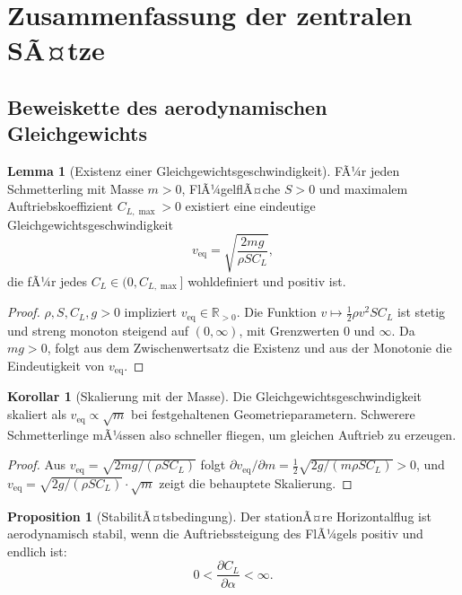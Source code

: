 ﻿\documentclass[a4paper,12pt]{article}
\theoremstyle{definition}
\newtheorem{lemma}{Lemma}
\newtheorem{korollar}{Korollar}
\newtheorem{proposition}{Proposition}
\begin{document}
	\section{Zusammenfassung der zentralen SÃ¤tze}
	
	\subsection{Beweiskette des aerodynamischen Gleichgewichts}
	
	\begin{lemma}[Existenz einer Gleichgewichtsgeschwindigkeit]
		\label{lem:gleichgewicht}
		FÃ¼r jeden Schmetterling mit Masse $m > 0$, FlÃ¼gelflÃ¤che $S > 0$ und
		maximalem Auftriebskoeffizient $C_{L,\max} > 0$ existiert eine eindeutige
		Gleichgewichtsgeschwindigkeit
		\[
		v_\mathrm{eq} = \sqrt{\frac{2mg}{\rho S C_L}},
		\]
		die fÃ¼r jedes $C_L \in (0, C_{L,\max}]$ wohldefiniert und positiv ist.
	\end{lemma}
	
	\begin{proof}
		$\rho, S, C_L, g > 0$ impliziert $v_\mathrm{eq} \in \mathbb{R}_{>0}$.
		Die Funktion $v \mapsto \frac{1}{2}\rho v^2 S C_L$ ist stetig und streng monoton
		steigend auf $(0,\infty)$, mit Grenzwerten $0$ und $\infty$.
		Da $mg > 0$, folgt aus dem Zwischenwertsatz die Existenz und aus der Monotonie
		die Eindeutigkeit von $v_\mathrm{eq}$.
	\end{proof}
	
	\begin{korollar}[Skalierung mit der Masse]
		Die Gleichgewichtsgeschwindigkeit skaliert als $v_\mathrm{eq} \propto \sqrt{m}$
		bei festgehaltenen Geometrieparametern.
		Schwerere Schmetterlinge mÃ¼ssen also schneller fliegen, um gleichen Auftrieb
		zu erzeugen.
	\end{korollar}
	
	\begin{proof}
		Aus $v_\mathrm{eq} = \sqrt{2mg/(\rho S C_L)}$ folgt
		$\partial v_\mathrm{eq}/\partial m = \frac{1}{2}\sqrt{2g/(m \rho S C_L)} > 0$,
		und $v_\mathrm{eq} = \sqrt{2g/(\rho S C_L)} \cdot \sqrt{m}$ zeigt die behauptete
		Skalierung.
	\end{proof}
	
	\begin{proposition}[StabilitÃ¤tsbedingung]
		Der stationÃ¤re Horizontalflug ist aerodynamisch stabil, wenn die Auftriebssteigung
		des FlÃ¼gels positiv und endlich ist:
		\[
		0 < \frac{\partial C_L}{\partial \alpha} < \infty.
		\]
	\end{proposition}
	
\end{document}
